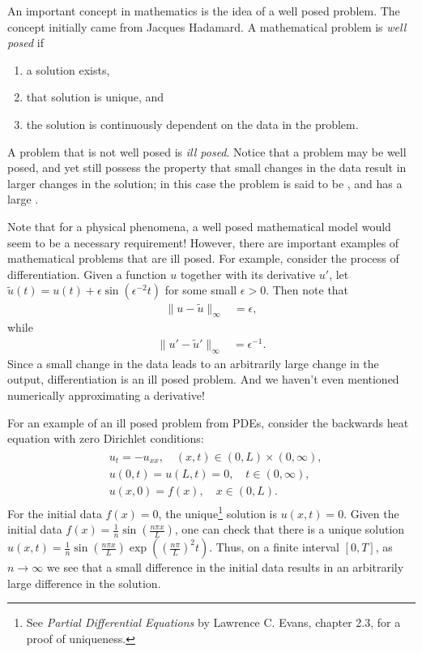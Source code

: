 \label{lab:inverse_problems}

An important concept in mathematics is the idea of a well posed problem.
The concept initially came from Jacques Hadamard.
A mathematical problem is \textit{well posed} if
\begin{enumerate}
	\item a solution exists,
	\item that solution is unique, and
	\item the solution is continuously dependent on the data in the problem.
\label{inverse_problems:continuous_dependence}
\end{enumerate}
A problem that is not well posed is \textit{ill posed}.
Notice that a problem may be well posed, and yet still possess the property that small changes in the data result in larger changes in the solution; in this case the problem is said to be , and has a large .

Note that for a physical phenomena, a well posed mathematical model would seem to be a necessary requirement!
However, there are important examples of mathematical problems that are ill posed.
For example, consider the process of differentiation.
Given a function $u$ together with its derivative $u'$, let $\tilde{u}(t) = u(t) +  \epsilon \sin(\epsilon^{-2}t)$ for some small $\epsilon > 0$.
Then note that
\begin{align*}
	\|u-\tilde{u}\|_{\infty} &= \epsilon,
\end{align*}
while
\begin{align*}
	\|u'-\tilde{u}'\|_{\infty} &= \epsilon^{-1}.
\end{align*}
Since a small change in the data leads to an arbitrarily large change in the output, differentiation is an ill posed problem.
And we haven't even mentioned numerically approximating a derivative!

For an example of an ill posed problem from PDEs, consider the backwards heat equation with zero Dirichlet conditions:
\begin{align}
\begin{split}
	&{} u_t = -u_{xx}, \quad (x,t) \in (0,L)\times (0,\infty),\\
	&{} u(0,t) = u(L,t) = 0, \quad t \in (0,\infty),\\
	&{} u(x,0) = f(x), \quad x \in (0,L).
\end{split}
\end{align}
For the initial data $f(x)=0$, the unique\footnote{See \textit{Partial Differential Equations} by Lawrence C. Evans, chapter 2.3, for a proof of uniqueness.} solution is $u(x,t) = 0.$
Given the initial data $f(x) = \frac{1}{n}\sin ( \frac{n \pi x}{L})$, one can check that there is a unique solution $u(x,t) = \frac{1}{n}\sin ( \frac{n \pi x}{L})\exp ( (\frac{n \pi }{L})^2 t)$.
Thus, on a finite interval $[0,T]$, as $n \to \infty$ we see that a small difference in the initial data results in an arbitrarily large difference in the solution.

